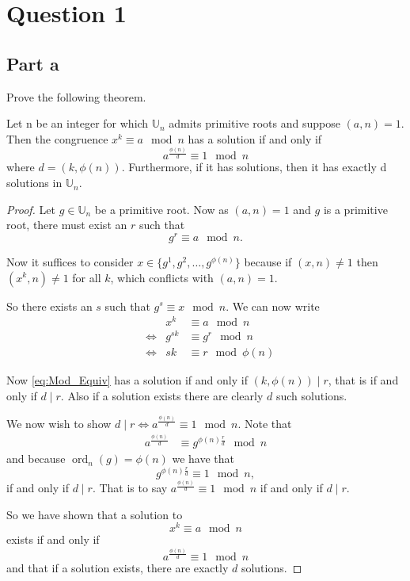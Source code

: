 \documentclass{unswmaths}
\begin{document}
\setlength\parindent{0pt}

\fancyfoot[r]{\today}


\section*{Question 1}
\subsection*{Part a}
Prove the following theorem.
\begin{unswthm}
Let n be an integer for which $ \mathbb{U}_n $ admits primitive roots and 
suppose $ (a,n) = 1 $. Then the congruence  $ x^k \equiv a \mod n $  has a solution 
if and only if $$ a^\frac{\phi(n)}{d} \equiv 1 \mod n $$
where $ d= (k, \phi(n)) $. Furthermore, if it has solutions, then it has exactly d
solutions in $ \mathbb{U}_n $.
\end{unswthm}
\begin{proof}
Let $ g \in \mathbb{U}_{n} $ be a primitive root.  
Now as $ (a, n) = 1 $ and $ g $ is a primitive root, there must exist an $ r $
such that $$ g^r \equiv a \mod n. $$

Now it suffices to consider $ x \in \{ g^1, g^2, \ldots, g^{\phi(n)} \} $ because if
$ (x, n) \neq 1 $ then $ (x^k, n) \neq 1 $ for all $ k $, which conflicts with
$ (a, n) = 1 $. 

So there exists an $ s $ such that $ g^s \equiv x \mod n $. We can now write
\begin{align}
	&&x^k &\equiv a \mod n \nonumber \\
	&\Leftrightarrow &g^{sk} &\equiv g^r \mod n \nonumber \\
	\label{eq:Mod_Equiv}
	&\Leftrightarrow &sk &\equiv r \mod \phi(n)
\end{align}

Now \eqref{eq:Mod_Equiv} has a solution if and only if $ (k, \phi(n)) \mid r $,
that is if and only if $ d \mid r $. Also if a solution exists there are clearly
$ d $ such solutions.

We now wish to show $ d \mid r \Leftrightarrow a^\frac{\phi(n)}{d} \equiv 1 \mod n $.
Note that 
\begin{align*}
	a^\frac{\phi(n)}{d} & \equiv g^{\phi(n)\frac{r}{d}} \mod n
\end{align*}
and because 
$ \operatorname{ord}_n(g) = \phi(n) $
we have that
$$ g^{\phi(n)\frac{r}{d}} \equiv 1 \mod n, $$
if and only if $ d \mid r $.
That is to say $ a^\frac{\phi(n)}{d} \equiv 1 \mod n $ if and only if $ d \mid r $.

So we have shown that a solution to $$ x^k \equiv a \mod n $$ exists if and only if
$$ a^\frac{\phi(n)}{d} \equiv 1 \mod n $$
and that if a solution exists, there are exactly $ d $ solutions.
\end{proof}
\end{document}
